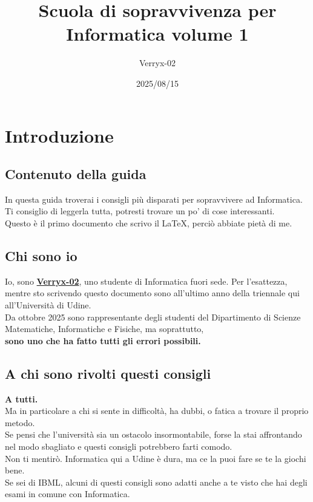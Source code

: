 \documentclass[18pt]{extarticle}
\title{Scuola di sopravvivenza per Informatica volume 1}
\author{Verryx-02}
\date{2025/08/15}
\begin{document}
\maketitle

\tableofcontents
\newpage

\section{Introduzione}

\subsection{Contenuto della guida}
In questa guida troverai i consigli più disparati per sopravvivere ad Informatica. Ti consiglio di leggerla tutta, potresti trovare un po' di cose interessanti.\\
Questo è il primo documento che scrivo il \LaTeX, perciò abbiate pietà di me.

\subsection{Chi sono io}
Io, sono \href{https://github.com/Verryx-02}{\textbf{Verryx-02}}, uno studente di Informatica fuori sede. 
Per l'esattezza, mentre sto scrivendo questo documento sono all'ultimo anno della triennale qui all'Università di Udine.\\
Da ottobre 2025 sono rappresentante degli studenti del Dipartimento di Scienze Matematiche, Informatiche e Fisiche, ma soprattutto,\\
\textbf{sono uno che ha fatto tutti gli errori possibili.}


\subsection{A chi sono rivolti questi consigli}
\textbf{A tutti.}\\
Ma in particolare a chi si sente in difficoltà, ha dubbi, o fatica a trovare il proprio metodo.\\
Se pensi che l'università sia un ostacolo insormontabile, forse la stai affrontando nel modo sbagliato e questi consigli potrebbero farti comodo.\\
Non ti mentirò. Informatica qui a Udine è dura, ma ce la puoi fare se te la giochi bene.\\
Se sei di IBML, alcuni di questi consigli sono adatti anche a te visto che hai degli esami in comune con Informatica. 
\end{document}
